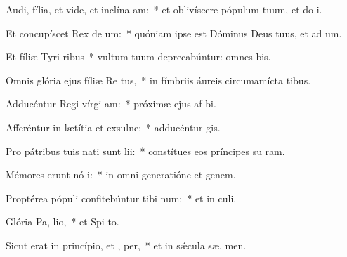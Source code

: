 \item Audi, fília, et vide, et inclína  am:~* et oblivíscere pópulum tuum, et do  i.
\item Et concupíscet Rex de um:~* quóniam ipse est Dóminus Deus tuus, et ad um.
\item Et fíliæ Tyri  ribus~* vultum tuum deprecabúntur: omnes  bis.
\item Omnis glória ejus fíliæ Re  tus,~* in fímbriis áureis circumamícta tibus.
\item Adducéntur Regi vírgi  am:~* próximæ ejus af bi.
\item Afferéntur in lætítia et exsulne:~* adducéntur   gis.
\item Pro pátribus tuis nati sunt  lii:~* constítues eos príncipes su  ram.
\item Mémores erunt nó i:~* in omni generatióne et genem.
\item Proptérea pópuli confitebúntur tibi  num:~* et in  culi.
\item Glória Pa,  lio,~* et Spi to.
\item Sicut erat in princípio, et ,  per,~* et in sǽcula sæ. men.

